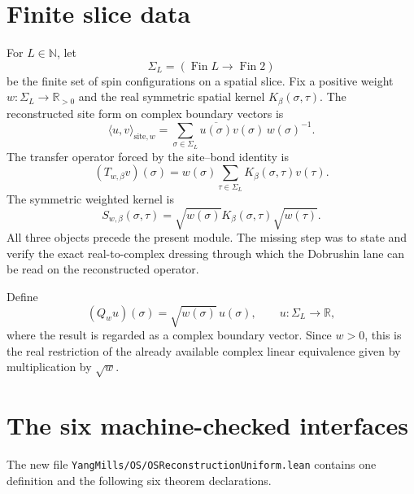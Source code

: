 \documentclass[11pt]{article}
\newcommand{\R}{\mathbb R}
\newcommand{\N}{\mathbb N}
\newcommand{\SigmaL}{\Sigma_L}
\begin{document}
\section{Finite slice data}

For $L\in\N$, let
\[
  \SigmaL=(\operatorname{Fin} L\to\operatorname{Fin}2)
\]
be the finite set of spin configurations on a spatial slice.  Fix a positive
weight $w:\SigmaL\to\R_{>0}$ and the real symmetric spatial kernel
$K_\beta(\sigma,\tau)$.  The reconstructed site form on complex boundary
vectors is
\begin{equation}\label{eq:site-form}
  \langle u,v\rangle_{\mathrm{site},w}
   =\sum_{\sigma\in\SigmaL}
      \overline{u(\sigma)}v(\sigma)\,w(\sigma)^{-1}.
\end{equation}
The transfer operator forced by the site--bond identity is
\begin{equation}\label{eq:transfer}
  (T_{w,\beta}v)(\sigma)
   =w(\sigma)\sum_{\tau\in\SigmaL}K_\beta(\sigma,\tau)v(\tau).
\end{equation}
The symmetric weighted kernel is
\begin{equation}\label{eq:symmetric}
  S_{w,\beta}(\sigma,\tau)
  =\sqrt{w(\sigma)}K_\beta(\sigma,\tau)\sqrt{w(\tau)}.
\end{equation}
All three objects precede the present module.  The missing step was to state
and verify the exact real-to-complex dressing through which the Dobrushin lane
can be read on the reconstructed operator.

Define
\begin{equation}\label{eq:qembed}
  (Q_w u)(\sigma)=\sqrt{w(\sigma)}\,u(\sigma),
  \qquad u:\SigmaL\to\R,
\end{equation}
where the result is regarded as a complex boundary vector.  Since $w>0$, this
is the real restriction of the already available complex linear equivalence
given by multiplication by $\sqrt w$.

\section{The six machine-checked interfaces}

The new file \texttt{YangMills/OS/OSReconstructionUniform.lean} contains one
definition and the following six theorem declarations.
\end{document}
